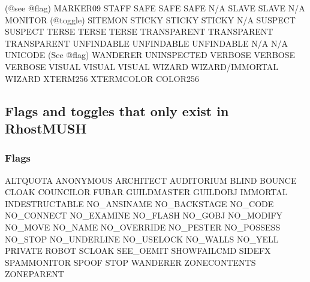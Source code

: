 \documentclass[letterpaper,10pt,english]{sphinxmanual}
\begin{document}
\begin{description}
(@see @flag)            MARKER0\sphinxhyphen{}9                              STAFF
SAFE                    SAFE                                   SAFE
N/A                     SLAVE                                  SLAVE
N/A                     MONITOR (@toggle)                      SITEMON
STICKY                  STICKY                                 STICKY
N/A                     SUSPECT                                SUSPECT
TERSE                   TERSE                                  TERSE
TRANSPARENT             TRANSPARENT                            TRANSPARENT
UNFINDABLE              UNFINDABLE                             UNFINDABLE
N/A                     N/A                                    UNICODE
(See @flag)             WANDERER                               UNINSPECTED
VERBOSE                 VERBOSE                                VERBOSE
VISUAL                  VISUAL                                 VISUAL
WIZARD                  WIZARD/IMMORTAL                        WIZARD
XTERM256                XTERMCOLOR                             COLOR256

\end{description}


\subsection{Flags and toggles that only exist in RhostMUSH}
\label{\detokenize{differences:flags-and-toggles-that-only-exist-in-rhostmush}}

\subsubsection{Flags}
\label{\detokenize{differences:flags}}
\sphinxAtStartPar
ALTQUOTA                     ANONYMOUS                     ARCHITECT
AUDITORIUM                   BLIND                         BOUNCE
CLOAK                        COUNCILOR                     FUBAR
GUILDMASTER                  GUILDOBJ                      IMMORTAL
INDESTRUCTABLE               NO\_ANSINAME                   NO\_BACKSTAGE
NO\_CODE                      NO\_CONNECT                    NO\_EXAMINE
NO\_FLASH                     NO\_GOBJ                       NO\_MODIFY
NO\_MOVE                      NO\_NAME                       NO\_OVERRIDE
NO\_PESTER                    NO\_POSSESS                    NO\_STOP
NO\_UNDERLINE                 NO\_USELOCK                    NO\_WALLS
NO\_YELL                      PRIVATE                       ROBOT
SCLOAK                       SEE\_OEMIT                     SHOWFAILCMD
SIDEFX                       SPAMMONITOR                   SPOOF
STOP                         WANDERER                      ZONECONTENTS
ZONEPARENT
\end{document}
